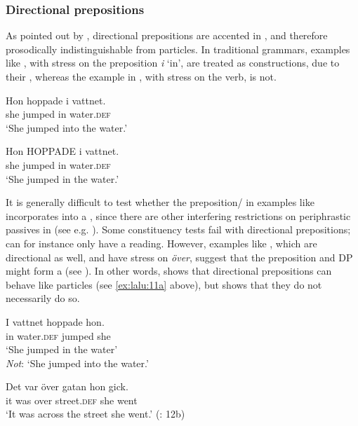 \documentclass[output=paper]{langscibook}
\begin{document}
\subsubsection{Directional prepositions} 

As pointed out by \citet{Svenonius2003}, directional prepositions are accented in , and therefore prosodically indistinguishable from particles. In traditional grammars, examples like , with stress on the preposition \textit{i} ‘in’, are treated as  constructions, due to their , whereas the  example in , with stress on the verb, is not.


\ea\label{ex:lalu:15}
\ea\label{ex:lalu:15a}
\gll  Hon   hoppade    i   vattnet. \\
    she     jumped     in   water\textsc{.def}\\
\glt `She jumped into the water.'

\ex\label{ex:lalu:15b}
\gll  Hon   HOPPADE   i   vattnet. \\
    she     jumped       in   water\textsc{.def}\\
\glt `She jumped in the water.'
\z
\z


It is generally difficult to test whether the preposition/ in examples like  incorporates into a , since there are other interfering restrictions on periphrastic passives in  (see e.g. \citealt{Engdahl2006}). Some constituency tests fail with directional prepositions;  can for instance only have a  reading. However, examples like , which are directional as well, and have stress on \textit{över}, suggest that the preposition and DP might form a  (see \citealt{Tungseth2006}). In other words,  shows that directional prepositions can behave like particles (see \ref{ex:lalu:11a} above), but  shows that they do not necessarily do so.


\ea\label{ex:lalu:16}
\ea\label{ex:lalu:16a}
\gll  I     vattnet   hoppade   hon. \\
    in     water\textsc{.def}  jumped   she\\
\glt `She jumped in the water\textsc{’}\\
    \emph{Not}: ‘She jumped into the water.'

\ex\label{ex:lalu:16b}
\gll  Det  var   över   gatan     hon   gick.\\
    it     was  over   street\textsc{.def}   she   went\\
\glt `It was across the street she went.'     (\citealt{Svenonius2003}: 12b)\\
\z
\z
\end{document}
